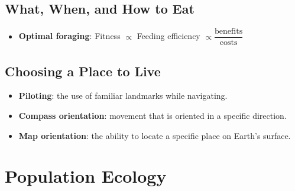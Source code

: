\documentclass[12pt,a4paper]{article}
\begin{document}
\subsection{What, When, and How to Eat}
\begin{itemize}
    \item \textbf{Optimal foraging}: Fitness \(\propto\) Feeding efficiency \(\propto \dfrac{\text{benefits}}{\text{costs}}\)
\end{itemize}
\setcounter{subsection}{3}
\subsection{Choosing a Place to Live}
\begin{itemize}
    \item \textbf{Piloting}: the use of familiar landmarks while navigating.
    \item \textbf{Compass orientation}: movement that is oriented in a specific direction.
    \item \textbf{Map orientation}: the ability to locate a specific place on Earth's surface.
\end{itemize}

\clearpage
\section{Population Ecology}
\end{document}
